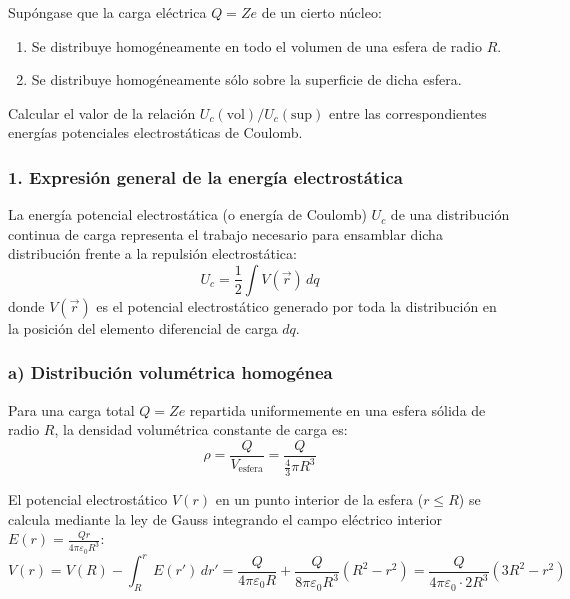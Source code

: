 \newpage
\begin{problema}
Supóngase que la carga eléctrica $Q = Z e$ de un cierto núcleo:
\begin{enumerate}[label=\alph*)]
    \item Se distribuye homogéneamente en todo el volumen de una esfera de radio $R$.
    \item Se distribuye homogéneamente sólo sobre la superficie de dicha esfera.
\end{enumerate}
Calcular el valor de la relación $U_c(\text{vol}) / U_c(\text{sup})$ entre las correspondientes energías potenciales electrostáticas de Coulomb.

\tcblower

\subsubsection*{1. Expresión general de la energía electrostática}

La energía potencial electrostática (o energía de Coulomb) $U_c$ de una distribución continua de carga representa el trabajo necesario para ensamblar dicha distribución frente a la repulsión electrostática:
\begin{equation}
U_c = \frac{1}{2} \int V(\vec{r}) \, dq
\end{equation}
donde $V(\vec{r})$ es el potencial electrostático generado por toda la distribución en la posición del elemento diferencial de carga $dq$.

\subsubsection*{a) Distribución volumétrica homogénea}

Para una carga total $Q = Z e$ repartida uniformemente en una esfera sólida de radio $R$, la densidad volumétrica constante de carga es:
\begin{equation}
\rho = \frac{Q}{V_{\text{esfera}}} = \frac{Q}{\frac{4}{3}\pi R^3}
\end{equation}

El potencial electrostático $V(r)$ en un punto interior de la esfera ($r \le R$) se calcula mediante la ley de Gauss integrando el campo eléctrico interior $E(r) = \frac{Q r}{4\pi\varepsilon_0 R^3}$:
\begin{equation}
V(r) = V(R) - \int_R^r E(r') \, dr' = \frac{Q}{4\pi\varepsilon_0 R} + \frac{Q}{8\pi\varepsilon_0 R^3} (R^2 - r^2) = \frac{Q}{4\pi\varepsilon_0 \cdot 2R^3} \left( 3R^2 - r^2 \right)
\end{equation}


\end{problema}
